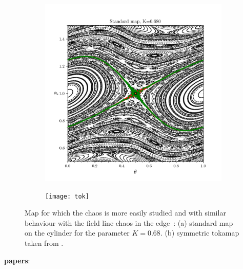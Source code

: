 \begin{figure}[h!]
    \centering
    \begin{subfigure}[t]{0.49\textwidth}
        \centering
        \includegraphics[width=\textwidth]{images/intro/manifold_0.680_28.png}
        \caption{}
        \label{fig:standard-map}
    \end{subfigure}
    \hfill
    \begin{subfigure}[t]{0.49\textwidth}
        \centering
        \texttt{[image: tok]}
        \caption{}
        \label{fig:tokamap}
    \end{subfigure}
    \caption{Map for which the chaos is more easily studied and with similar behaviour with the field line chaos in the edge~: (a) standard map on the cylinder for the parameter $K=0.68$. (b) symmetric tokamap taken from \cite{wingen_stochastic_2005}.}
    \label{fig:mapping-the-chaos}
\end{figure}

\textbf{papers}:

